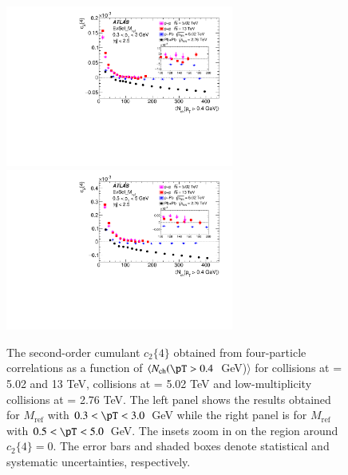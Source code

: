 \documentclass[cernpreprint,texlive=2014,txfonts,UKenglish]{latex/atlasdoc}
\begin{document}
\begin{figure}[ht!]
\begin{center}
\includegraphics[width=75mm]{fig_06a.pdf}
\includegraphics[width=75mm]{fig_06b.pdf}
\caption{The second-order cumulant $c_2\{4\}$ obtained from four-particle correlations as a function of $\langle N_{\mathrm{ch}}(\pT > 0.4$~GeV)$\rangle$  for \pp collisions at \sqs= 5.02 and 13 TeV, \pPb collisions at \sqn= 5.02 TeV and low-multiplicity \PbPb collisions at \sqn= 2.76 TeV. The left panel shows the results obtained for $M_{\mathrm{ref}}$ with  $0.3< \pT < 3.0$~GeV while the right panel is for $M_{\mathrm{ref}}$ with  $0.5< \pT < 5.0$~GeV. The insets zoom in on the region around $c_2\{4\}= 0$. The error bars and shaded boxes denote statistical and systematic uncertainties, respectively.}
\label{fig:cum24All} 
\end{center}
\end{figure}
\end{document}
